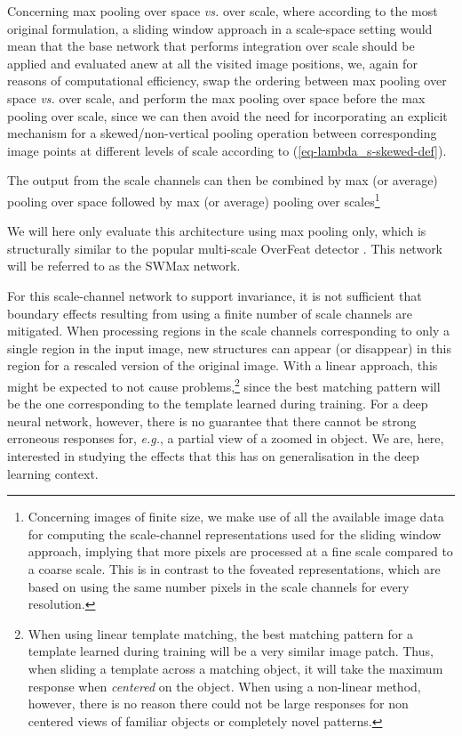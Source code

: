 \documentclass[twocolumn,runningheads]{svjour3}
\begin{document}
Concerning max pooling over space {\em vs.\/} over scale,
where according to the most original formulation, a sliding window
approach in a scale-space setting
would mean that the base network that performs integration
over scale should be applied and evaluated anew at all the visited
image positions, we, again for reasons of computational efficiency,
swap the ordering between max pooling
over space {\em vs.\/} over scale, and perform the max pooling over space before
the max pooling over scale, since we can then avoid the need for
incorporating an explicit mechanism for a
skewed/non-vertical pooling operation between corresponding image points
at different levels of scale according to (\ref{eq-lambda_s-skewed-def}).

The output from the scale channels can then be combined by max (or
average) pooling over space followed by max (or average) pooling over
scales\footnote{Concerning images of finite size, we make use of all the available image data
for computing the scale-channel representations used for the sliding
window approach, implying that more pixels are processed at a fine
scale compared to a coarse scale. This is in contrast to the
foveated representations, which are based on using the same number
pixels in the scale channels for every resolution.}

We will here only evaluate this architecture using max pooling only, which
is structurally similar to the popular multi-scale OverFeat detector
\cite{SerEigZhaMatFerLeC13-arXiv}. This network will be referred to as
the SWMax network. 

For this scale-channel network to support
invariance, it is not sufficient that boundary effects resulting from
using a finite number of scale channels are mitigated. When processing
regions in the scale channels corresponding to only a single region in
the input image, new structures can appear (or disappear) in this
region for a rescaled version of the original image. With a linear
approach, this might be expected to not cause problems,\footnote{When using linear template matching, the best matching
  pattern for a template learned during training will be a very
  similar image patch. Thus, when sliding a template across a matching
  object, it will take the maximum response when {\em centered\/} on
  the object. When using a non-linear method, however, there is no
  reason there could not be large responses for non centered views of
  familiar objects or completely novel patterns.}
since the best matching pattern will be the one corresponding to the template learned during training. 
For a deep neural network, however, there is no guarantee that there
cannot be strong erroneous responses for, {\em e.g.\/}, a partial view of a
zoomed in object. We are, here, interested in studying the effects
that this has on generalisation in the deep learning context. 
\end{document}
